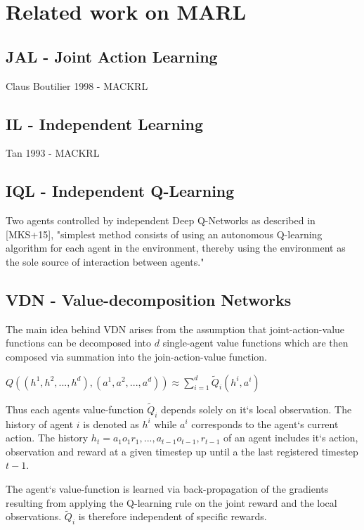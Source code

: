 \chapter{Related work on MARL}

%
%
%
\section{JAL - Joint Action Learning}
Claus Boutilier 1998 - MACKRL

\section{IL - Independent Learning}
Tan 1993 - MACKRL
%
%
%
\section{IQL - Independent Q-Learning}
Two agents controlled by independent Deep Q-Networks as described in [MKS+15], "simplest method consists of using an autonomous Q-learning algorithm for each agent
in the environment, thereby using the environment as the sole source of interaction between agents."
%
%
%
\section{VDN - Value-decomposition Networks}
The main idea behind VDN arises from the assumption that joint-action-value functions can be decomposed into $ \mathit{d} $ single-agent value functions which are then composed via summation into the join-action-value function.

\begin{center}
	$ Q((h^1, h^2, ..., h^d),(a^1, a^2, ..., a^d)) \approx \sum_{i=1}^{d} \tilde{Q}_i(h^i, a^i) $
\end{center}

Thus each agents value-function $ \tilde{Q}_i $ depends solely on it`s local observation. The history of agent $\mathit{i}$ is denoted as $h^i$ while $a^i$ corresponds to the agent`s current action. The history $h_t = a_1o_1r_1,...,a_{t-1}o_{t-1},r_{t-1}$ of an agent includes it`s action, observation and reward at a given timestep up until a the last registered timestep ${t-1}$. 

The agent`s value-function is learned via back-propagation of the gradients resulting from applying the Q-learning rule on the joint reward and the local observations. $ \tilde{Q}_i $ is therefore independent of specific rewards.

